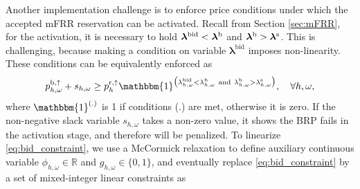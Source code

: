 Another implementation challenge is to enforce price conditions under which the accepted mFRR reservation can be activated.
Recall from Section \ref{sec:mFRR}, for the activation, it is necessary to hold $ \bm{\lambda}^{\text{bid}} <  \bm{\lambda}^{\rm{b}}$ and $ \bm{\lambda}^{\rm{b}} > \bm{\lambda}^{\rm{s}}$. This is challenging, because making a condition on variable $ \bm{\lambda}^{\text{bid}}$ imposes non-linearity. These conditions can be equivalently enforced as
%
%
\begin{equation}\label{eq:bid_constraint}
    p^{\rm{b}, \uparrow}_{h,\omega} + s_{h,\omega} \geq p^{\rm{r},\uparrow}_{h}  \mathbbm{1}^{\big(\lambda^{\text{bid}}_{h,\omega} < \lambda^{\rm{b}}_{h,\omega} \ \text{and} \ \lambda^{\rm{b}}_{h,\omega} > \lambda^{\rm{s}}_{h,\omega}\big)}, \quad \forall{h,\omega},
\end{equation}
where $\mathbbm{1}^{(.)}$ is 1 if conditions (.) are met, otherwise it is zero. If the non-negative slack variable $s_{h,\omega}$ takes a non-zero value, it shows the BRP fails in the activation stage, and therefore will be penalized. To linearize \eqref{eq:bid_constraint}, we use a McCormick relaxation \cite{mccormick1976computability} to define auxiliary continuous variable $\phi_{h,\omega} \in \mathbb{R}$ and $g_{h,\omega} \in \{0, 1\}$, and eventually replace \eqref{eq:bid_constraint} by a set of mixed-integer linear constraints as
%
%
